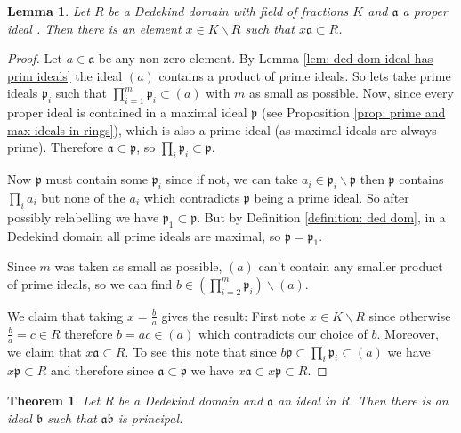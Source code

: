 \documentclass[11pt,a4paper]{report}
\theoremstyle{plain}
\newtheorem{thm}[subsection]{Theorem}
\newtheorem{lem}[subsection]{Lemma}
\theoremstyle{definition}
\theoremstyle{definition}
\def\gothb{\mathfrak{b}}
\def\gothp{\mathfrak{p}}
\def\gotha{\mathfrak{a}}
\begin{document}
	\begin{lem}\label{lem: proper ideal mult by frac is still int}
		Let $R$ be a Dedekind domain with field of fractions $K$ and $\gotha$ a proper ideal . Then there is an element $x \in K \backslash R$ such that $x \gotha \subset R$.
	\end{lem}
	
	\begin{proof}
		Let $a \in \gotha$ be any non-zero element. By Lemma \ref{lem: ded dom ideal has prim ideals} the ideal $(a)$ contains a product of prime ideals. So lets take prime ideals $\gothp_i$ such that  $\prod_{i=1}^m \gothp_i \subset (a)$ with $m$ as small as possible. Now, since every proper ideal is contained in a maximal ideal $\gothp$ (see Proposition \ref{prop: prime and max ideals in rings}), which is also a prime ideal (as maximal ideals are always prime). Therefore $\gotha \subset \gothp$, so $\prod_i \gothp_i \subset \gothp$. 
		
		Now $\gothp$ must contain some $\gothp_i$ since if not, we can take $a_i \in \gothp_i \backslash \gothp$ then $\gothp$ contains $\prod_i a_i$ but none of the $a_i$ which contradicts $\gothp$ being a prime ideal. So after possibly relabelling we have $\gothp_1 \subset \gothp$. But by Definition \ref{definition: ded dom}, in a Dedekind domain all prime ideals are maximal, so $\gothp=\gothp_1$.
		
		Since $m$ was taken as small as possible, $(a)$ can't contain any smaller product of prime ideals, so we can find $b \in (\prod_{i=2}^m \gothp_i) \backslash (a)$. 
		
		We claim that taking $x=\frac{b}{a}$ gives the result: First note $x \in K \backslash R$ since otherwise $\frac{b}{a}=c \in R$ therefore $b=ac \in (a)$ which contradicts our choice of $b$. Moreover, we claim that $x \gotha \subset R$. To see this note that since $b \gothp \subset \prod_i \gothp_i \subset (a)$ we have $x \gothp \subset R$ and therefore since $\gotha \subset \gothp$ we have $x\gotha \subset x\gothp \subset R$.
		
		
		
	\end{proof}
	
	
	\begin{thm}\label{thm: ideals are invertible}
		Let $R$ be a Dedekind domain and $\gotha$ an ideal in $R$. Then there is an ideal $\gothb$ such that $\gotha \gothb$ is principal.
	\end{thm}
	
\end{document}
